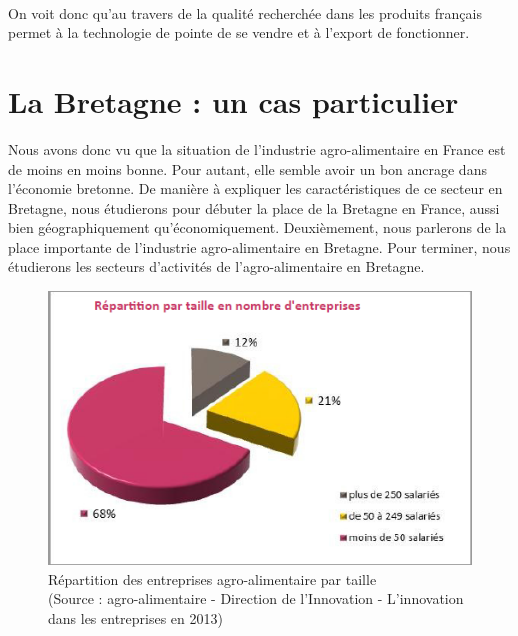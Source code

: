 \documentclass[a4paper,12pt]{report}
\begin{document}
			\paragraph{}On voit donc qu'au travers de la qualité recherchée dans les produits français permet à la technologie de pointe de se vendre et à l'export de fonctionner.

	\section{La Bretagne : un cas particulier}
	Nous avons donc vu que la situation de l’industrie agro-alimentaire en France est de moins en moins bonne. Pour autant, elle semble avoir un bon ancrage dans l’économie bretonne. De manière à expliquer les caractéristiques de ce secteur en Bretagne, nous étudierons pour débuter la place de la Bretagne en France, aussi bien géographiquement qu’économiquement. Deuxièmement, nous parlerons de la place importante de l’industrie agro-alimentaire en Bretagne. Pour terminer, nous étudierons les secteurs d’activités de l’agro-alimentaire en Bretagne.
	
	
	\begin{figure}[!h]
	\centering
	\includegraphics[scale=1]{Illustrations/RepartitionTaille.png}
	\caption{Répartition des entreprises agro-alimentaire par taille\\(Source : agro-alimentaire - Direction de l’Innovation - L’innovation dans les entreprises en 2013\cite{InnovationEntreprises2013})}
	\label{RepartitionParTaille}
	\end{figure}
	
\end{document}
